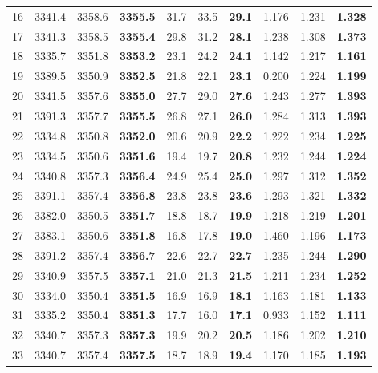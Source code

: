 \documentclass[a4paper,11pt]{article}
\begin{document}
\begin{longtable}{l rrr rrr rrr}
  16 & 3341.4 & 3358.6 & \textbf{3355.5} & 31.7 & 33.5 & \textbf{29.1} & 1.176 & 1.231 & \textbf{1.328} \\
  17 & 3341.3 & 3358.5 & \textbf{3355.4} & 29.8 & 31.2 & \textbf{28.1} & 1.238 & 1.308 & \textbf{1.373} \\
  18 & 3335.7 & 3351.8 & \textbf{3353.2} & 23.1 & 24.2 & \textbf{24.1} & 1.142 & 1.217 & \textbf{1.161} \\
  19 & 3389.5 & 3350.9 & \textbf{3352.5} & 21.8 & 22.1 & \textbf{23.1} & 0.200 & 1.224 & \textbf{1.199} \\
  20 & 3341.5 & 3357.6 & \textbf{3355.0} & 27.7 & 29.0 & \textbf{27.6} & 1.243 & 1.277 & \textbf{1.393} \\
  21 & 3391.3 & 3357.7 & \textbf{3355.5} & 26.8 & 27.1 & \textbf{26.0} & 1.284 & 1.313 & \textbf{1.393} \\
  22 & 3334.8 & 3350.8 & \textbf{3352.0} & 20.6 & 20.9 & \textbf{22.2} & 1.222 & 1.234 & \textbf{1.225} \\
  23 & 3334.5 & 3350.6 & \textbf{3351.6} & 19.4 & 19.7 & \textbf{20.8} & 1.232 & 1.244 & \textbf{1.224} \\
  24 & 3340.8 & 3357.3 & \textbf{3356.4} & 24.9 & 25.4 & \textbf{25.0} & 1.297 & 1.312 & \textbf{1.352} \\
  25 & 3391.1 & 3357.4 & \textbf{3356.8} & 23.8 & 23.8 & \textbf{23.6} & 1.293 & 1.321 & \textbf{1.332} \\
  26 & 3382.0 & 3350.5 & \textbf{3351.7} & 18.8 & 18.7 & \textbf{19.9} & 1.218 & 1.219 & \textbf{1.201} \\
  27 & 3383.1 & 3350.6 & \textbf{3351.8} & 16.8 & 17.8 & \textbf{19.0} & 1.460 & 1.196 & \textbf{1.173} \\
  28 & 3391.2 & 3357.4 & \textbf{3356.7} & 22.6 & 22.7 & \textbf{22.7} & 1.235 & 1.244 & \textbf{1.290} \\
  29 & 3340.9 & 3357.5 & \textbf{3357.1} & 21.0 & 21.3 & \textbf{21.5} & 1.211 & 1.234 & \textbf{1.252} \\
  30 & 3334.0 & 3350.4 & \textbf{3351.5} & 16.9 & 16.9 & \textbf{18.1} & 1.163 & 1.181 & \textbf{1.133} \\
  31 & 3335.2 & 3350.4 & \textbf{3351.3} & 17.7 & 16.0 & \textbf{17.1} & 0.933 & 1.152 & \textbf{1.111} \\
  32 & 3340.7 & 3357.3 & \textbf{3357.3} & 19.9 & 20.2 & \textbf{20.5} & 1.186 & 1.202 & \textbf{1.210} \\
  33 & 3340.7 & 3357.4 & \textbf{3357.5} & 18.7 & 18.9 & \textbf{19.4} & 1.170 & 1.185 & \textbf{1.193} \\

\end{longtable}
\end{document}
